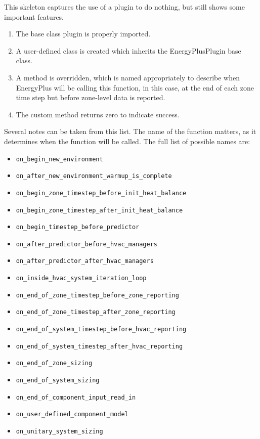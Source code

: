 This skeleton captures the use of a plugin to do nothing, but still shows some important features.
\begin{enumerate}
    \item The base class plugin is properly imported.
    \item A user-defined class is created which inherits the EnergyPlusPlugin base class.
    \item A method is overridden, which is named appropriately to describe when EnergyPlus will be calling this function, in this case, at the end of each zone time step but before zone-level data is reported.
    \item The custom method returns zero to indicate success.
\end{enumerate}

Several notes can be taken from this list.
The name of the function matters, as it determines when the function will be called.
The full list of possible names are:
\begin{itemize}
    \item \verb=on_begin_new_environment=
    \item \verb=on_after_new_environment_warmup_is_complete=
    \item \verb=on_begin_zone_timestep_before_init_heat_balance=
    \item \verb=on_begin_zone_timestep_after_init_heat_balance=
    \item \verb=on_begin_timestep_before_predictor=
    \item \verb=on_after_predictor_before_hvac_managers=
    \item \verb=on_after_predictor_after_hvac_managers=
    \item \verb=on_inside_hvac_system_iteration_loop=
    \item \verb=on_end_of_zone_timestep_before_zone_reporting=
    \item \verb=on_end_of_zone_timestep_after_zone_reporting=
    \item \verb=on_end_of_system_timestep_before_hvac_reporting=
    \item \verb=on_end_of_system_timestep_after_hvac_reporting=
    \item \verb=on_end_of_zone_sizing=
    \item \verb=on_end_of_system_sizing=
    \item \verb=on_end_of_component_input_read_in=
    \item \verb=on_user_defined_component_model=
    \item \verb=on_unitary_system_sizing=
\end{itemize}

